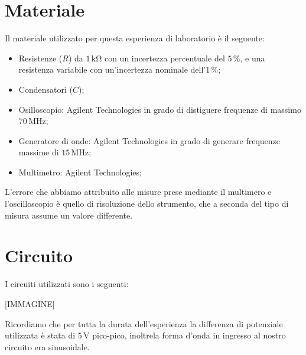 \section*{Materiale}

Il materiale utilizzato per questa esperienza di laboratorio è il seguente:

\begin{itemize}
	\item{Resistenze ($R$) da $1\,\si{\kilo\ohm}$ con un incertezza percentuale del $5\,\%$, e una resistenza variabile con un'incertezza nominale dell'$1\,\%$;}
	\item{Condensatori ($C$);}
	\item{Osilloscopio: Agilent Technologies in grado di distiguere frequenze di massimo $70\,\si{\mega\hertz}$;}
	\item{Generatore di onde: Agilent Technologies in grado di generare frequenze massime di $15\,\si{\mega\hertz}$;}
	\item{Multimetro: Agilent Technologies;}
\end{itemize}

L'errore che abbiamo attribuito alle misure prese mediante il multimero e l'oscilloscopio è quello di risoluzione dello strumento, che a seconda del tipo di misura assume un valore differente.

\section*{Circuito}

I circuiti utilizzati sono i seguenti:

[IMMAGINE]

Ricordiamo che per tutta la durata dell'esperienza la differenza di potenziale utilizzata è stata di $5\,\si{\volt}$ pico-pico, inoltrela forma d'onda in ingresso al nostro circuito era sinusoidale.
